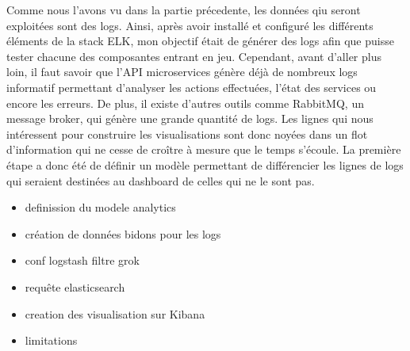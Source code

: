 	Comme nous l'avons vu dans la partie précedente, les données qiu seront exploitées sont des logs. Ainsi, après avoir installé et configuré les différents éléments de la stack ELK, mon objectif était de générer des logs afin que puisse tester chacune des composantes entrant en jeu. Cependant, avant d'aller plus loin, il faut savoir que l'API microservices génère déjà de nombreux logs informatif permettant d'analyser les actions effectuées, l'état des services ou encore les erreurs. De plus, il existe d'autres outils comme RabbitMQ, un message broker, qui génère une grande quantité de logs. Les lignes qui nous intéressent pour construire les visualisations sont donc noyées dans un flot d'information qui ne cesse de croître à mesure que le temps s'écoule. La première étape a donc été de définir un modèle permettant de différencier les lignes de logs qui seraient destinées au dashboard de celles qui ne le sont pas. \\

\begin{itemize}
	\item definission du modele analytics
	\item création de données bidons pour les logs
	\item conf logstash filtre grok
	\item requête elasticsearch
	\item creation des visualisation sur Kibana
	\item limitations
\end{itemize}